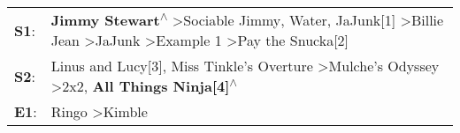 \begin{supertabular}{p{0.03\textwidth}p{0.92\textwidth}}
 \textbf{S1}:  &  \textbf{Jimmy Stewart\textsuperscript{$\wedge$}} \textgreater \enspace Sociable Jimmy\textsuperscript{}, \enspace Water\textsuperscript{}, \enspace JaJunk[1]\textsuperscript{} \textgreater \enspace Billie Jean\textsuperscript{} \textgreater \enspace JaJunk\textsuperscript{} \textgreater \enspace Example 1\textsuperscript{} \textgreater \enspace Pay the Snucka[2]\textsuperscript{}  \enspace  \\
 \textbf{S2}:  &                                                                                                                                    Linus and Lucy[3]\textsuperscript{}, \enspace Miss Tinkle's Overture\textsuperscript{} \textgreater \enspace Mulche's Odyssey\textsuperscript{} \textgreater \enspace 2x2\textsuperscript{}, \enspace \textbf{All Things Ninja[4]\textsuperscript{$\wedge$}}  \enspace  \\
 \textbf{E1}:  &                                                                                                                                                                                                                                                                                                                          Ringo\textsuperscript{} \textgreater \enspace Kimble\textsuperscript{}  \enspace  \\
\end{supertabular}
